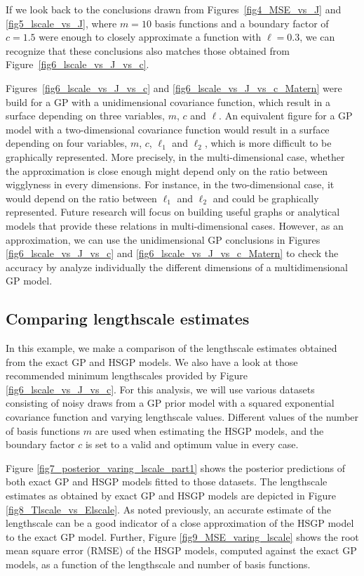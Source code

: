 \documentclass[onecolumn,a4paper,11pt]{article}
\begin{document}
If we look back to the conclusions drawn from Figures~\ref{fig4_MSE_vs_J} and \ref{fig5_lscale_vs_J}, where $m = 10$ basis functions and a boundary factor of $c = 1.5$ were enough to closely approximate a function with $\ell = 0.3$, we can recognize that these conclusions also matches those obtained from Figure~\ref{fig6_lscale_vs_J_vs_c}.

Figures~\ref{fig6_lscale_vs_J_vs_c} and \ref{fig6_lscale_vs_J_vs_c_Matern} were build for a GP with a unidimensional covariance function, which result in a surface depending on three variables, $m$, $c$ and $\ell$. An equivalent figure for a GP model with a two-dimensional covariance function would result in a surface depending on four variables, $m$, $c$, $\ell_1$ and $\ell_2$, which is more difficult to be graphically represented. More precisely, in the multi-dimensional case, whether the approximation is close enough might depend only on the ratio between wigglyness in every dimensions. For instance, in the two-dimensional case, it would depend on the ratio between $\ell_1$ and $\ell_2$ and could be graphically represented. Future research will focus on building useful graphs or analytical models that provide these relations in multi-dimensional cases. However, as an approximation, we can use the unidimensional GP conclusions in Figures \ref{fig6_lscale_vs_J_vs_c} and \ref{fig6_lscale_vs_J_vs_c_Matern} to check the accuracy by analyze individually the different dimensions of a multidimensional GP model.

\subsection{Comparing lengthscale estimates}

In this example, we make a comparison of the lengthscale estimates
obtained from the exact GP and HSGP models. We also have a look at those recommended minimum lengthscales provided by Figure \ref{fig6_lscale_vs_J_vs_c}.
For this analysis, we will use various datasets consisting of noisy draws from a GP prior model with a squared exponential covariance function and varying lengthscale values. Different values of the number of basis functions $m$ are used when estimating the HSGP models, and the boundary factor $c$ is set to a valid and optimum value in every case. 

Figure \ref{fig7_posterior_varing_lscale_part1} shows the posterior predictions of both exact GP and HSGP models fitted to those datasets. The lengthscale estimates as obtained by exact GP and HSGP models are depicted in Figure \ref{fig8_Tlscale_vs_Elscale}. As noted previously, an accurate estimate of the lengthscale can be a good indicator of a close approximation of the HSGP model to the exact GP model. Further, Figure \ref{fig9_MSE_varing_lscale} shows the root mean square error (RMSE) of the HSGP models, computed against the exact GP models, as a function of the lengthscale and number of basis functions.
\end{document}
